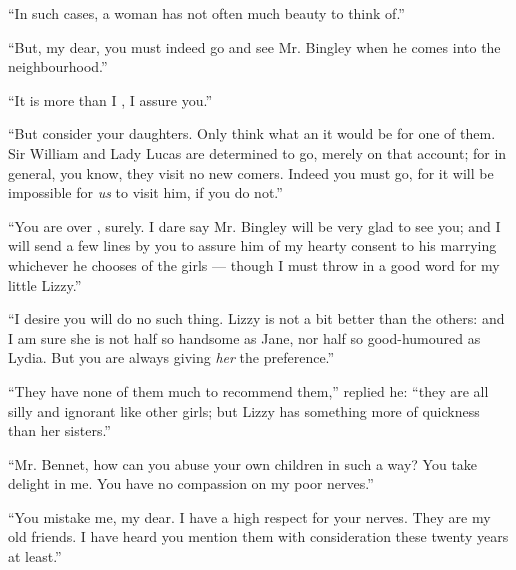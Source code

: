 \documentclass{fiche}
\begin{document}
\begin{texte}
``In such cases, a woman has not often much beauty to think of.''

``But, my dear, you must indeed go and see Mr. Bingley when he comes into the neighbourhood.''

``It is more than I  , I assure you.''

``But consider your daughters. Only think what an
 it would be for one of
them. Sir William and Lady Lucas are determined to go, merely on that account; for in general,
you know, they visit no new comers. Indeed you must go, for it will be impossible for
\emph{us} to visit him, if you do not.''

``You are over , surely. I dare say Mr. Bingley will be
very glad to see you; and I will send a few lines by you to assure him of my hearty consent to
his marrying whichever he chooses of the girls --- though I must throw in a good word for my
little Lizzy.''

``I desire you will do no such thing. Lizzy is not a bit better than the others: and I am sure
she is not half so handsome as Jane, nor half so good-humoured as Lydia. But you are always
giving \emph{her} the preference.''

``They have none of them much to recommend them,'' replied he: ``they are all silly and
ignorant like other girls; but Lizzy has something more of quickness than her sisters.''

``Mr. Bennet, how can you abuse your own children in such a way? You take delight in
 me. You have no compassion on my poor nerves.''

``You mistake me, my dear. I have a high respect for your nerves. They are my old friends. I
have heard you mention them with consideration these twenty years at least.''
\end{texte}

\end{document}
